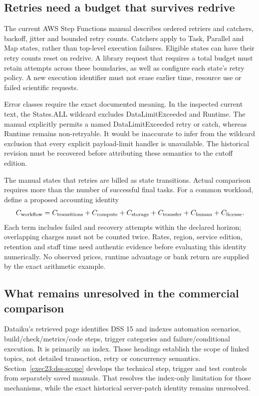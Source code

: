 \subsection{Retries need a budget that survives redrive}

The current AWS Step Functions manual describes ordered retriers and catchers,
backoff, jitter and bounded retry counts. Catchers apply to Task, Parallel and
Map states, rather than top-level execution failures. Eligible states can have
their retry counts reset on redrive. A library request that requires a total
budget must retain attempts across these boundaries, as well as configure each
state's retry policy. A new execution identifier must not erase earlier time,
resource use or failed scientific requests.
\citep{exec22_workflow_aws_errors}

Error classes require the exact documented meaning. In the inspected current
text, the States.ALL wildcard excludes DataLimitExceeded and Runtime. The
manual explicitly permits a named DataLimitExceeded retry or catch, whereas
Runtime remains non-retryable. It would be inaccurate to infer from the
wildcard exclusion that every explicit payload-limit handler is unavailable.
The historical revision must be recovered before attributing these semantics
to the cutoff edition.~\citep{exec22_workflow_aws_errors}

The manual states that retries are billed as state transitions. Actual
comparison requires more than the number of successful final tasks. For a
common workload, define a proposed accounting identity
\begin{equation}
 C_{\rm workflow}=C_{\rm transitions}+C_{\rm compute}+C_{\rm storage}
                  +C_{\rm transfer}+C_{\rm human}+C_{\rm license}.
 \label{exec22:workflow-cost}
\end{equation}
Each term includes failed and recovery attempts within the declared horizon;
overlapping charges must not be counted twice. Rates, region, service edition,
retention and staff time need authentic evidence before evaluating this
identity numerically. No observed prices, runtime advantage or bank return
are supplied by the exact arithmetic example.

\subsection{What remains unresolved in the commercial comparison}

Dataiku's retrieved page identifies DSS 15 and indexes automation scenarios,
build/check/metrics/code steps, trigger categories and failure/conditional
execution. It is primarily an index. Those headings establish the scope of
linked topics, not detailed transaction, retry or concurrency semantics.
Section~\ref{exec23:dss-scope} develops the technical step, trigger and test controls from separately saved manuals. That resolves the index-only limitation for those mechanisms, while the exact historical server-patch identity remains unresolved.~\citep{exec22_workflow_dataiku_scenarios}

